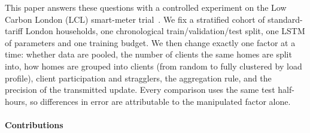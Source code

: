 This paper answers these questions with a controlled experiment on the Low Carbon London (LCL) smart-meter
trial~\cite{ukpn2015lcl}. We fix a stratified cohort of \NumHouseholds{} standard-tariff London households, one
chronological train/validation/test split, one LSTM of \NumParams{} parameters and one training budget. We then change
exactly one factor at a time: whether data are pooled, the number of clients the same homes are split into, how
homes are grouped into clients (from random to fully clustered by load profile), client participation and stragglers,
the aggregation rule, and the precision of the transmitted update. Every comparison uses the same test half-hours,
so differences in error are attributable to the manipulated factor alone.

\paragraph{Contributions}
